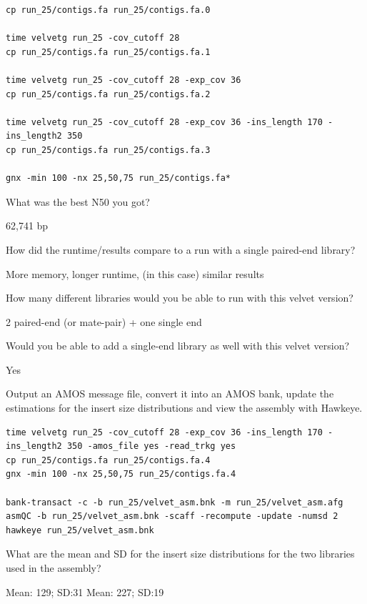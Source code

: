 \begin{steps}
\begin{lstlisting}
cp run_25/contigs.fa run_25/contigs.fa.0

time velvetg run_25 -cov_cutoff 28 
cp run_25/contigs.fa run_25/contigs.fa.1

time velvetg run_25 -cov_cutoff 28 -exp_cov 36 
cp run_25/contigs.fa run_25/contigs.fa.2

time velvetg run_25 -cov_cutoff 28 -exp_cov 36 -ins_length 170 -ins_length2 350
cp run_25/contigs.fa run_25/contigs.fa.3

gnx -min 100 -nx 25,50,75 run_25/contigs.fa*
\end{lstlisting}

\end{steps}

\begin{questions}
What was the best N50 you got?
\begin{answer}
62,741 bp
\end{answer}

How did the runtime/results compare to a run with a single paired-end library?
\begin{answer}
More memory, longer runtime, (in this case) similar results
\end{answer}

How many different libraries would you be able to run with this velvet version?
\begin{answer}
2 paired-end (or mate-pair) + one single end
\end{answer}

Would you be able to add a single-end library as well with this velvet version?
\begin{answer}
Yes
\end{answer}
\end{questions}


\begin{bonus}
Output an AMOS message file, convert it into an AMOS bank, update the
estimations for the insert size distributions and view the assembly with
Hawkeye.

\begin{lstlisting}
time velvetg run_25 -cov_cutoff 28 -exp_cov 36 -ins_length 170 -ins_length2 350 -amos_file yes -read_trkg yes
cp run_25/contigs.fa run_25/contigs.fa.4
gnx -min 100 -nx 25,50,75 run_25/contigs.fa.4

bank-transact -c -b run_25/velvet_asm.bnk -m run_25/velvet_asm.afg
asmQC -b run_25/velvet_asm.bnk -scaff -recompute -update -numsd 2
hawkeye run_25/velvet_asm.bnk
\end{lstlisting}

\begin{questions}
What are the mean and SD for the insert size distributions for the two libraries
used in the assembly?
\begin{answer}
Mean: 129; SD:31
Mean: 227; SD:19
\end{answer}
\end{questions}

\end{bonus}

